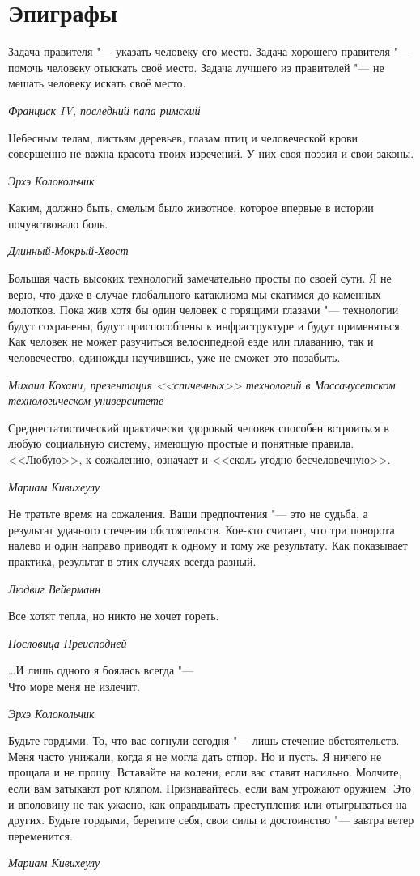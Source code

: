 \documentclass[a4paper,10pt]{book}
\begin{document}
 \tableofcontents

 
 
\chapter{Эпиграфы}

\epigraph{Задача правителя "--- указать человеку его место.
Задача хорошего правителя "--- помочь человеку отыскать своё место.
Задача лучшего из правителей "--- не мешать человеку искать своё место.}
{\textit{Франциск IV, последний папа римский}}

\epigraph{Небесным телам, листьям деревьев, глазам птиц и человеческой крови совершенно не важна красота твоих изречений.
У них своя поэзия и свои законы.}
{\textit{Эрхэ Колокольчик}}

\epigraph{Каким, должно быть, смелым было животное, которое впервые в истории почувствовало боль.}
{\textit{Длинный-Мокрый-Хвост}}

\epigraph{Большая часть высоких технологий замечательно просты по своей сути.
Я не верю, что даже в случае глобального катаклизма мы скатимся до каменных молотков.
Пока жив хотя бы один человек с горящими глазами "--- технологии будут сохранены, будут приспособлены к инфраструктуре и будут применяться.
Как человек не может разучиться велосипедной езде или плаванию, так и человечество, единожды научившись, уже не сможет это позабыть.}
{\textit{Михаил Кохани, презентация <<спичечных>> технологий в Массачусетском технологическом университете}}

\epigraph{Среднестатистический практически здоровый человек способен встроиться в любую социальную систему, имеющую простые и понятные правила. <<Любую>>, к сожалению, означает и <<сколь угодно бесчеловечную>>.}
{\textit{Мариам Кивихеулу}}

\epigraph{Не тратьте время на сожаления. Ваши предпочтения "--- это не судьба, а результат удачного стечения обстоятельств. Кое-кто считает, что три поворота налево и один направо приводят к одному и тому же результату. Как показывает практика, результат в этих случаях всегда разный.}
{\textit{Людвиг Вейерманн}}

\epigraph{Все хотят тепла, но никто не хочет гореть.}
{\textit{Пословица Преисподней}}

\epigraph{\dots И лишь одного я боялась всегда "---\\Что море меня не излечит.}
{\textit{Эрхэ Колокольчик}}

\epigraph{Будьте гордыми. То, что вас согнули сегодня "--- лишь стечение обстоятельств. Меня часто унижали, когда я не могла дать отпор. Но и пусть. Я ничего не прощала и не прощу. Вставайте на колени, если вас ставят насильно. Молчите, если вам затыкают рот кляпом. Признавайтесь, если вам угрожают оружием. Это и вполовину не так ужасно, как оправдывать преступления или отыгрываться на других. Будьте гордыми, берегите себя, свои силы и достоинство "--- завтра ветер переменится.}
{\textit{Мариам Кивихеулу}}
\end{document}
